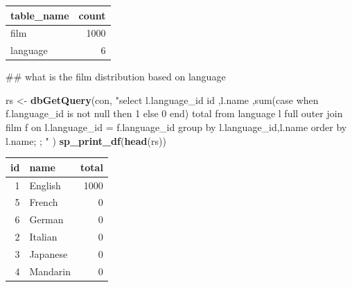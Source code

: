 \documentclass[]{book}
\newenvironment{Shaded}{\begin{snugshade}}{\end{snugshade}}
\newcommand{\KeywordTok}[1]{\textcolor[rgb]{0.13,0.29,0.53}{\textbf{#1}}}
\newcommand{\NormalTok}[1]{#1}
\newcommand{\StringTok}[1]{\textcolor[rgb]{0.31,0.60,0.02}{#1}}
\theoremstyle{definition}
\theoremstyle{definition}
\theoremstyle{definition}
\theoremstyle{remark}
\begin{document}
\begin{tabular}{l|r}
\hline
table\_name & count\\
\hline
film & 1000\\
\hline
language & 6\\
\hline
\end{tabular}

\begin{Shaded}
\begin{Highlighting}[]
\NormalTok{## what is the film distribution based on language}

\NormalTok{rs <-}\StringTok{ }\KeywordTok{dbGetQuery}\NormalTok{(con,}
                \StringTok{"select l.language_id id}
\StringTok{                       ,l.name}
\StringTok{                       ,sum(case when f.language_id is not null then 1 else 0 end) total}
\StringTok{                   from language l}
\StringTok{                        full outer join film f}
\StringTok{                             on l.language_id = f.language_id}
\StringTok{                  group by l.language_id,l.name }
\StringTok{                  order by l.name;}
\StringTok{                 ;}
\StringTok{                "}
\NormalTok{                )}
\KeywordTok{sp_print_df}\NormalTok{(}\KeywordTok{head}\NormalTok{(rs))}
\end{Highlighting}
\end{Shaded}

\begin{tabular}{r|l|r}
\hline
id & name & total\\
\hline
1 & English & 1000\\
\hline
5 & French & 0\\
\hline
6 & German & 0\\
\hline
2 & Italian & 0\\
\hline
3 & Japanese & 0\\
\hline
4 & Mandarin & 0\\
\hline
\end{tabular}
\end{document}
